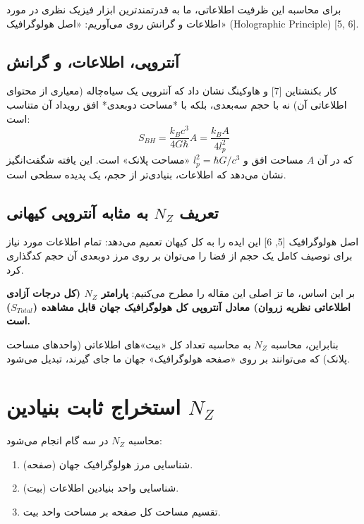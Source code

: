 \documentclass[11pt, a4paper, twocolumn]{article} %
\begin{document}
برای محاسبه این ظرفیت اطلاعاتی، ما به قدرتمندترین ابزار فیزیک نظری در مورد اطلاعات و گرانش روی می‌آوریم: «اصل هولوگرافیک» (Holographic Principle) [5, 6].

\subsection{آنتروپی، اطلاعات، و گرانش}

کار بکنشتاین [7] و هاوکینگ نشان داد که آنتروپی یک سیاه‌چاله (معیاری از محتوای اطلاعاتی آن) نه با حجم سه‌بعدی، بلکه با *مساحت دوبعدی* افق رویداد آن متناسب است:
\begin{equation}
S_{BH} = \frac{k_B c^3}{4 G \hbar} A = \frac{k_B A}{4 l_p^2}
\end{equation}
که در آن $A$ مساحت افق و $l_p^2 = \hbar G / c^3$ «مساحت پلانک» است. این یافته شگفت‌انگیز نشان می‌دهد که اطلاعات، بنیادی‌تر از حجم، یک پدیده سطحی است.

\subsection{تعریف $N_Z$ به مثابه آنتروپی کیهانی}

اصل هولوگرافیک [5, 6] این ایده را به کل کیهان تعمیم می‌دهد: تمام اطلاعات مورد نیاز برای توصیف کامل یک حجم از فضا را می‌توان بر روی مرز دوبعدی آن حجم کدگذاری کرد.

بر این اساس، ما تز اصلی این مقاله را مطرح می‌کنیم:
\textbf{پارامتر $N_Z$ (کل درجات آزادی اطلاعاتی نظریه زروان) معادل آنتروپی کل هولوگرافیک جهان قابل مشاهده ($S_{Total}$) است.}

بنابراین، محاسبه $N_Z$ به محاسبه تعداد کل «بیت»های اطلاعاتی (واحدهای مساحت پلانک) که می‌توانند بر روی «صفحه هولوگرافیک» جهان ما جای گیرند، تبدیل می‌شود.

\section{استخراج ثابت بنیادین $N_Z$}

محاسبه $N_Z$ در سه گام انجام می‌شود:
\begin{enumerate}
    \item شناسایی مرز هولوگرافیک جهان (صفحه).
    \item شناسایی واحد بنیادین اطلاعات (بیت).
    \item تقسیم مساحت کل صفحه بر مساحت واحد بیت.
\end{enumerate}
\end{document}
